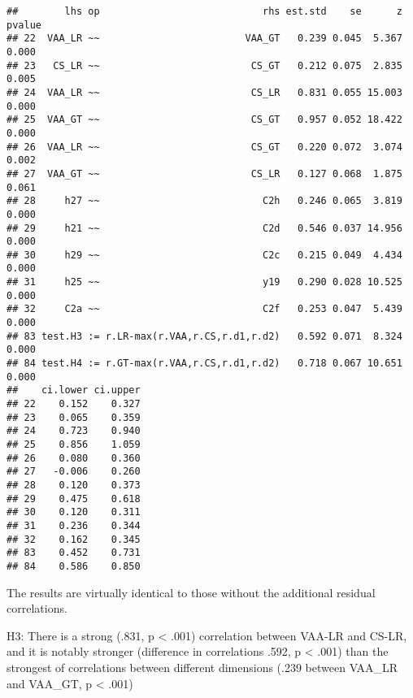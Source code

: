 \documentclass[
]{article}
\newenvironment{Shaded}{\begin{snugshade}}{\end{snugshade}}
\newcommand{\CommentTok}[1]{\textcolor[rgb]{0.56,0.35,0.01}{\textit{#1}}}
\newcommand{\DecValTok}[1]{\textcolor[rgb]{0.00,0.00,0.81}{#1}}
\newcommand{\KeywordTok}[1]{\textcolor[rgb]{0.13,0.29,0.53}{\textbf{#1}}}
\newcommand{\NormalTok}[1]{#1}
\newcommand{\OperatorTok}[1]{\textcolor[rgb]{0.81,0.36,0.00}{\textbf{#1}}}
\newcommand{\StringTok}[1]{\textcolor[rgb]{0.31,0.60,0.02}{#1}}
\begin{document}
\begin{verbatim}
##        lhs op                            rhs est.std    se      z pvalue
## 22  VAA_LR ~~                         VAA_GT   0.239 0.045  5.367  0.000
## 23   CS_LR ~~                          CS_GT   0.212 0.075  2.835  0.005
## 24  VAA_LR ~~                          CS_LR   0.831 0.055 15.003  0.000
## 25  VAA_GT ~~                          CS_GT   0.957 0.052 18.422  0.000
## 26  VAA_LR ~~                          CS_GT   0.220 0.072  3.074  0.002
## 27  VAA_GT ~~                          CS_LR   0.127 0.068  1.875  0.061
## 28     h27 ~~                            C2h   0.246 0.065  3.819  0.000
## 29     h21 ~~                            C2d   0.546 0.037 14.956  0.000
## 30     h29 ~~                            C2c   0.215 0.049  4.434  0.000
## 31     h25 ~~                            y19   0.290 0.028 10.525  0.000
## 32     C2a ~~                            C2f   0.253 0.047  5.439  0.000
## 83 test.H3 := r.LR-max(r.VAA,r.CS,r.d1,r.d2)   0.592 0.071  8.324  0.000
## 84 test.H4 := r.GT-max(r.VAA,r.CS,r.d1,r.d2)   0.718 0.067 10.651  0.000
##    ci.lower ci.upper
## 22    0.152    0.327
## 23    0.065    0.359
## 24    0.723    0.940
## 25    0.856    1.059
## 26    0.080    0.360
## 27   -0.006    0.260
## 28    0.120    0.373
## 29    0.475    0.618
## 30    0.120    0.311
## 31    0.236    0.344
## 32    0.162    0.345
## 83    0.452    0.731
## 84    0.586    0.850
\end{verbatim}

\begin{Shaded}
\end{Shaded}

The results are virtually identical to those without the additional
residual correlations.

H3: There is a strong (.831, p \textless{} .001) correlation between
VAA-LR and CS-LR, and it is notably stronger (difference in correlations
.592, p \textless{} .001) than the strongest of correlations between
different dimensions (.239 between VAA\_LR and VAA\_GT, p \textless{}
.001)
\end{document}
